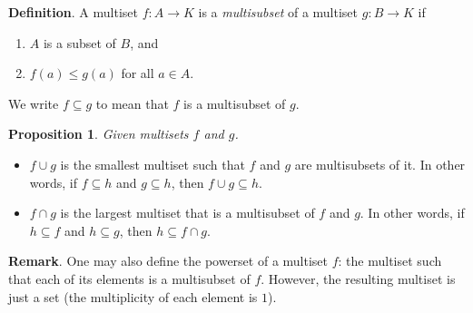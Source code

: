 \documentclass[12pt]{article}
\newtheorem{prop}{Proposition}
\begin{document}
\textbf{Definition}.  A multiset $f:A\to K$ is a \emph{multisubset} of a multiset $g:B\to K$ if 
\begin{enumerate}
\item $A$ is a subset of $B$, and
\item $f(a)\le g(a)$ for all $a\in A$.
\end{enumerate}
We write $f\subseteq g$ to mean that $f$ is a multisubset of $g$.

\begin{prop} Given multisets $f$ and $g$. \end{prop}
\begin{itemize}
\item $f\cup g$ is the smallest multiset such that $f$ and $g$ are multisubsets of it.  In other words, if $f\subseteq h$ and $g\subseteq h$, then $f\cup g \subseteq h$.
\item $f\cap g$ is the largest multiset that is a multisubset of $f$ and $g$.  In other words, if $h\subseteq f$ and $h\subseteq g$, then $h\subseteq f\cap g$.
\end{itemize}

\textbf{Remark}.  One may also define the powerset of a multiset $f$: the multiset such that each of its elements is a multisubset of $f$.  However, the resulting multiset is just a set (the multiplicity of each element is $1$).
\end{document}
